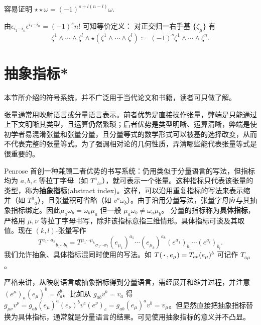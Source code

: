 \begin{theorem}容易证明
    ${\star}{\star}\omega=(-1)^{s+l(n-l)} \omega$.
\end{theorem}

\begin{theorem}
    由$\epsilon_{i_1\cdots i_n}\epsilon^{i_1\cdots i_n}=(-1)^s n!$ 可知等价定义：
    对正交归一右手基 $\{\zeta_\mu\}$ 有
    \[\zeta^{1}\wedge\cdots\wedge \zeta^{l}\wedge\star(\zeta^{1}\wedge\cdots\wedge \zeta^{l}):=(-1)^s \zeta^{1}\wedge\cdots\wedge \zeta^{n}.\]
\end{theorem}



\section{抽象指标*}

本节所介绍的符号系统，并不广泛用于当代论文和书籍，读者可只做了解。

张量通常用映射语言或分量语言表示。前者优势是直接操作张量，弊端是只能通过上下文明晰其类型，且运算仍然繁琐；后者优势是类型明晰、运算清晰，弊端是使初学者易混淆张量和张量分量，且分量等式的数学形式可以被基的选择改变，从而不代表完整的张量等式。为了强调相对论的几何性质，弄清哪些能代表张量等式是很重要的。

Penrose 首创一种兼顾二者优势的书写系统：仍用类似于分量语言的写法，但指标均为 $a,b,c$ 等拉丁字母（如 $T^a{}_{bc}$），就可表示一个张量。这种指标只代表该张量的类型，称为\textbf{抽象指标}(abstract index)。这样，可以沿用重复指标的写法来表示缩并（如 $T^a{}_a$），且张量积可省略（如 $v^a\omega_b$）。由于沿用分量写法，张量字母应与其抽象指标绑定。因此$\mu_a\omega_b=\omega_b\mu_a$ 但一般 $\mu_a\omega_b\ne\omega_a\mu_b$。
分量的指标称为\textbf{具体指标}，严格用 $\mu,\nu$ 等拉丁字母书写，除非该指标意指三维情形。具体指标可谈及其取值。现在 $(k,l)$-张量写作
\[T^{a_1\cdots a_k}{}_{b_1\cdots b_l}=T^{\mu_1\cdots\mu_k}{}_{\sigma_1\cdots\sigma_l}(e_{\mu_1})^{a_1}\cdots(e_{\mu_k})^{a_k} (e^{\sigma_1})_{b_1} \cdots (e^{\sigma_l})_{b_l}.\]
我们允许抽象、具体指标混同时使用的写法。如 $T(\oo,e_\mu)=T_{ab}(e_\mu)^b$ 可记作 $T_{a\mu}$。

严格来讲，从映射语言或抽象指标得到分量语言，需经展开和缩并过程，并注意 $(e^\mu)_a(e_\mu)^b=\delta_a^b$。比如从 $g_{ab} v^b=v_a$ 得 $g_{\mu\nu} v^\nu=g_{ab} (e_\mu)^a(e_\nu)^b v^c (e^\nu)_c=g_{ab} (e_\mu)^a v^b=v_\mu$。但显然直接把抽象指标替换为具体指标，通常就是分量语言的结果。可见使用抽象指标的意义并不凸显。

